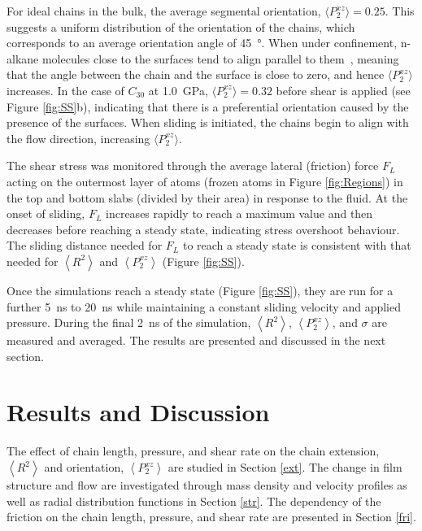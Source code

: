 \documentclass[5p]{elsarticle}
\begin{document}
For ideal chains in the bulk, the average segmental orientation, $\langle P_{2}^{xz}\rangle=0.25$. This suggests a uniform distribution of the orientation of the chains, which corresponds to an average orientation angle of \SI{45}{\degree}. When under confinement, n-alkane molecules close to the surfaces tend to align parallel to them~\cite{Cho2017}, meaning that the angle between the chain and the surface is close to zero, and hence $\langle P_{2}^{xz}\rangle$ increases. In the case of $C_{30}$ at \SI{1.0}{\giga\pascal}, $\langle P_{2}^{xz}\rangle=0.32$ before shear is applied (see Figure \ref{fig:SS}b), indicating that there is a preferential orientation caused by the presence of the surfaces. When sliding is initiated, the chains begin to align with the flow direction, increasing $\langle P_{2}^{xz}\rangle$.

The shear stress was monitored through the average lateral (friction) force $F_L$ acting on the outermost layer of atoms (frozen atoms in Figure \ref{fig:Regions}) in the top and bottom slabs (divided by their area) in response to the fluid. At the onset of sliding, $F_L$ increases rapidly to reach a maximum value and then decreases before reaching a steady state, indicating stress overshoot behaviour\cite{Jeong2017}. The sliding distance needed for $F_L$ to reach a steady state is consistent with that needed for $\left< R^2 \right> $ and $\left<P_{2}^{xz} \right> $ (Figure \ref{fig:SS}).

Once the simulations reach a steady state (Figure \ref{fig:SS}), they are run for a further \SI{5}{\nano\second} to \SI{20}{\nano\second} while maintaining a constant sliding velocity and applied pressure. During the final \SI{2}{\nano\second} of the simulation, $\left< R^2 \right>$, $\left<P_{2}^{xz} \right> $, and $\sigma$ are measured and averaged. The results are presented and discussed in the next section.


\section{Results and Discussion}

The effect of chain length, pressure, and shear rate on the chain extension, $\left< R^2 \right>$ and orientation, $\left<P_{2}^{xz} \right> $ are studied in Section \ref{ext}. The change in film structure and flow are investigated through mass density and velocity profiles as well as radial distribution functions in Section \ref{str}. The dependency of the friction on the chain length, pressure, and shear rate are presented in Section \ref{fri}.
\end{document}
